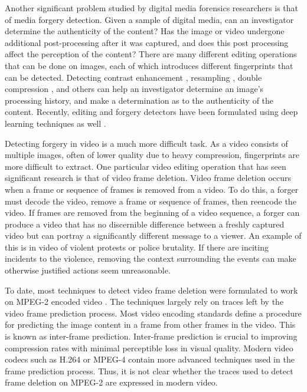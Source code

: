 Another significant problem studied by digital media forensics researchers is that of media forgery detection. Given a sample of digital media, can an investigator determine the authenticity of the content? Has the image or video undergone additional post-processing after it was captured, and does this post processing affect the perception of the content? There are many different editing operations that can be done on images, each of which introduces different fingerprints that can be detected. Detecting contrast enhancement \cite{contrastenhance, U, V}, resampling \cite{resampling, S, T}, double compression \cite{doubleJPEG, T, W, X}, and others \cite{lca, Y, Z, AA, BB, CC, DD, EE, FF} can help an investigator determine an image's processing history, and make a determination as to the authenticity of the content. Recently, editing and forgery detectors have been formulated using deep learning techniques as well \cite{imagesourceid}. 

Detecting forgery in video is a much more difficult task. As a video consists of multiple images, often of lower quality due to heavy compression, fingerprints are more difficult to extract. One particular video editing operation that has seen significant research is that of video frame deletion. Video frame deletion occurs when a frame or sequence of frames is removed from a video. To do this, a forger must decode the video, remove a frame or sequence of frames, then reencode the video. If frames are removed from the beginning of a video sequence, a forger can produce a video that has no discernible difference between a freshly captured video but can portray a significantly different message to a viewer. An example of this is in video of violent protests or police brutality. If there are inciting incidents to the violence, removing the context surrounding the events can make otherwise justified actions seem unreasonable.

To date, most techniques to detect video frame deletion were formulated to work on MPEG-2 encoded video\cite{wang} \cite{stamm}. The techniques largely rely on traces left by the video frame prediction process. Most video encoding standards define a procedure for predicting the image content in a frame from other frames in the video. This is known as inter-frame prediction. Inter-frame prediction is crucial to improving compression rates with minimal perceptible loss in visual quality. Modern video codecs such as H.264 or MPEG-4 contain more advanced techniques used in the frame prediction process. Thus, it is not clear whether the traces used to detect frame deletion on MPEG-2 are expressed in modern video. 

